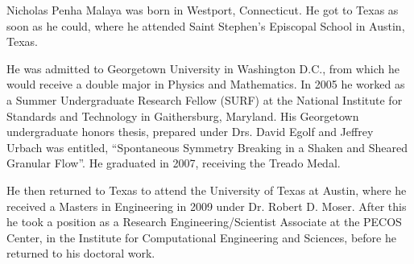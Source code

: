 
Nicholas Penha Malaya was born in Westport, Connecticut. He got to Texas
as soon as he could, where he attended Saint Stephen's Episcopal School in
Austin, Texas. 

He was admitted to Georgetown University in Washington D.C., from
which he would receive a double major in Physics and Mathematics. In
2005 he worked as a Summer Undergraduate Research Fellow (SURF) at the
National Institute for Standards and Technology in Gaithersburg,
Maryland. His Georgetown undergraduate honors thesis, prepared under
Drs\@. David Egolf and Jeffrey Urbach was entitled, ``Spontaneous
Symmetry Breaking in a Shaken and Sheared Granular Flow''. He graduated
in 2007, receiving the Treado Medal.   

He then returned to Texas to attend the University of Texas at
Austin, where he received a Masters in Engineering in 2009 under
Dr\@. Robert D. Moser. After this he took a position as a Research
Engineering/Scientist Associate at the PECOS Center, in the Institute
for Computational Engineering and Sciences, before he returned to his
doctoral work. 

